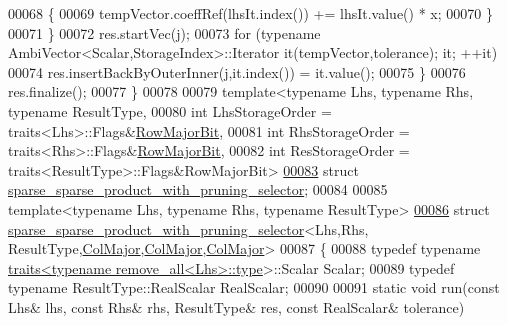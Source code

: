 \begin{DoxyCode}
00068       \{
00069         tempVector.coeffRef(lhsIt.index()) += lhsIt.value() * x;
00070       \}
00071     \}
00072     res.startVec(j);
00073     \textcolor{keywordflow}{for} (\textcolor{keyword}{typename} AmbiVector<Scalar,StorageIndex>::Iterator it(tempVector,tolerance); it; ++it)
00074       res.insertBackByOuterInner(j,it.index()) = it.value();
00075   \}
00076   res.finalize();
00077 \}
00078 
00079 \textcolor{keyword}{template}<\textcolor{keyword}{typename} Lhs, \textcolor{keyword}{typename} Rhs, \textcolor{keyword}{typename} ResultType,
00080   \textcolor{keywordtype}{int} LhsStorageOrder = traits<Lhs>::Flags&\hyperlink{group__flags_gae4f56c2a60bbe4bd2e44c5b19cbe8762}{RowMajorBit},
00081   \textcolor{keywordtype}{int} RhsStorageOrder = traits<Rhs>::Flags&\hyperlink{group__flags_gae4f56c2a60bbe4bd2e44c5b19cbe8762}{RowMajorBit},
00082   \textcolor{keywordtype}{int} ResStorageOrder = traits<ResultType>::Flags&RowMajorBit>
\hyperlink{struct_eigen_1_1internal_1_1sparse__sparse__product__with__pruning__selector}{00083} \textcolor{keyword}{struct }\hyperlink{struct_eigen_1_1internal_1_1sparse__sparse__product__with__pruning__selector}{sparse\_sparse\_product\_with\_pruning\_selector};
00084 
00085 \textcolor{keyword}{template}<\textcolor{keyword}{typename} Lhs, \textcolor{keyword}{typename} Rhs, \textcolor{keyword}{typename} ResultType>
\hyperlink{struct_eigen_1_1internal_1_1sparse__sparse__product__with__pruning__selector_3_01_lhs_00_01_rhs_a7892c8b610053f5d59f33edb611e816}{00086} \textcolor{keyword}{struct }\hyperlink{struct_eigen_1_1internal_1_1sparse__sparse__product__with__pruning__selector}{sparse\_sparse\_product\_with\_pruning\_selector}<Lhs,Rhs,
      ResultType,\hyperlink{group__enums_ggaacded1a18ae58b0f554751f6cdf9eb13a0cbd4bdd0abcfc0224c5fcb5e4f6669a}{ColMajor},\hyperlink{group__enums_ggaacded1a18ae58b0f554751f6cdf9eb13a0cbd4bdd0abcfc0224c5fcb5e4f6669a}{ColMajor},\hyperlink{group__enums_ggaacded1a18ae58b0f554751f6cdf9eb13a0cbd4bdd0abcfc0224c5fcb5e4f6669a}{ColMajor}>
00087 \{
00088   \textcolor{keyword}{typedef} \textcolor{keyword}{typename} \hyperlink{struct_eigen_1_1internal_1_1traits}{traits<typename remove\_all<Lhs>::type}>::Scalar 
      Scalar;
00089   \textcolor{keyword}{typedef} \textcolor{keyword}{typename} ResultType::RealScalar RealScalar;
00090 
00091   \textcolor{keyword}{static} \textcolor{keywordtype}{void} run(\textcolor{keyword}{const} Lhs& lhs, \textcolor{keyword}{const} Rhs& rhs, ResultType& res, \textcolor{keyword}{const} RealScalar& tolerance)

\end{DoxyCode}
